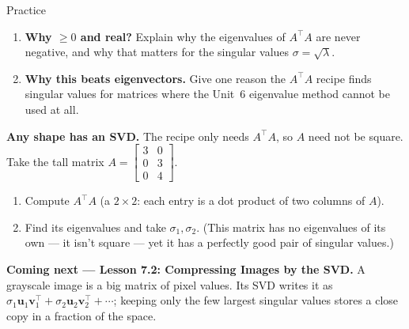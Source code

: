 \documentclass[10pt]{article}
\newcommand{\uu}{\mathbf{u}}
\newcommand{\vv}{\mathbf{v}}
\newcommand{\T}{^{\top}}
\begin{document}
\begin{notesbox}{Practice}
\begin{enumerate}[leftmargin=1.9em, itemsep=12pt]
        $\uu_2=A\vv_2/\sigma_2$, and verify it is a unit vector. 
  \item \textbf{Why $\ge0$ and real?} Explain why the eigenvalues of $A\T A$ are never negative, and why
        that matters for the singular values $\sigma=\sqrt{\lambda}$. 
  \item \textbf{Why this beats eigenvectors.} Give one reason the $A\T A$ recipe finds singular values
        for matrices where the Unit~6 eigenvalue method cannot be used at all. 
\end{enumerate}
\end{notesbox}

\begin{extensionbox}
\textbf{Any shape has an SVD.} The recipe only needs $A\T A$, so $A$ need not be square. Take the tall
matrix $A=\begin{bmatrix} 3 & 0 \\ 0 & 3 \\ 0 & 4 \end{bmatrix}$.
\begin{enumerate}[label=(\alph*), leftmargin=1.8em, itemsep=5pt]
  \item Compute $A\T A$ (a $2\times2$: each entry is a dot product of two columns of $A$).
  \item Find its eigenvalues and take $\sigma_1,\sigma_2$. (This matrix has no eigenvalues of its own ---
        it isn't square --- yet it has a perfectly good pair of singular values.)
\end{enumerate}
\end{extensionbox}

\begin{spiralbox}
\textbf{Coming next --- Lesson 7.2: Compressing Images by the SVD.} A grayscale image is a big matrix of
pixel values. Its SVD writes it as $\sigma_1\uu_1\vv_1\T+\sigma_2\uu_2\vv_2\T+\cdots$; keeping only the
few largest singular values stores a close copy in a fraction of the space.
\end{spiralbox}
\end{document}
